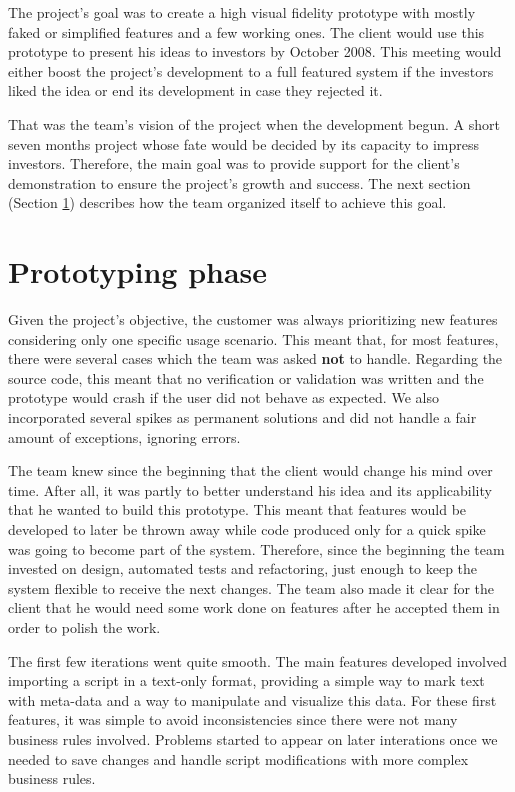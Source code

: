 \documentclass[lnbip]{svmultln}
\begin{document}
The project's goal was to create a high visual fidelity prototype with mostly faked or
simplified features and a few working ones. The client would use this
prototype to present his ideas to investors by October 2008. This
meeting would either boost the project's development to a full
featured system if the investors liked the idea or end its development
in case they rejected it.

That was the team's vision of the project when the development
begun. A short seven months project whose fate would be decided by its
capacity to impress investors. Therefore, the main goal was to provide
 support for the client's demonstration to ensure the
project's growth and success. The next section (Section
\ref{sec:working}) describes how the team organized itself to achieve
this goal.

\section{Prototyping phase}
\label{sec:working}

Given the project's objective, the customer was always prioritizing new features considering only one specific usage scenario. This meant that, for most features, there were several cases which the team was asked \textbf{not} to handle. Regarding the source code, this meant that no verification or validation was written and the prototype would crash if the user did not behave as expected. We also incorporated several spikes as permanent solutions and did not handle a fair amount of exceptions, ignoring errors.

The team knew since the beginning that the client would change his mind over time. After all, it was partly to better understand his idea and its applicability that he wanted to build this prototype. This meant that features would be developed to later be thrown away while code produced only for a quick spike was going to become part of the system. Therefore, since the beginning the team invested on design, automated tests and refactoring, just enough to keep the system flexible to receive the next changes. The team also made it clear for the client that he would need some work done on features after he accepted them in order to polish the work.

The first few iterations went quite smooth. The main features developed involved importing a script in a text-only format, providing a simple way to mark text with meta-data and a way to manipulate and visualize this data. For these first features, it was simple to avoid inconsistencies since there were not many business rules involved. Problems started to appear on later interations once we needed to save changes and handle script modifications with more complex business rules.
\end{document}
